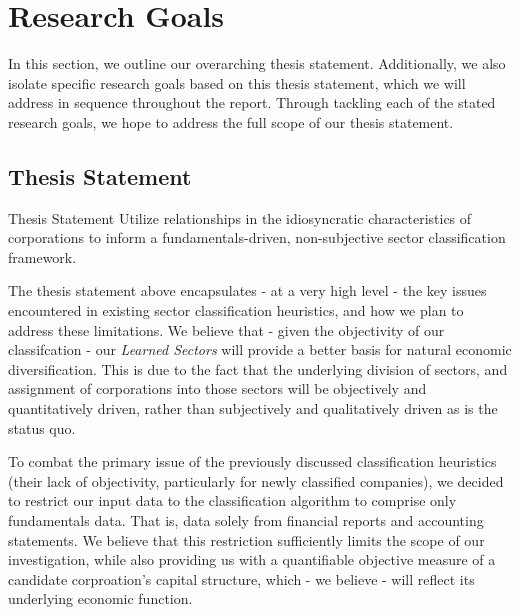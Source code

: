 \documentclass[../main.tex]{subfiles}
\begin{document}
    
\chapter{Research Goals} \label{research_goals}
    
In this section, we outline our overarching thesis statement. Additionally, we also isolate specific research goals based on this thesis statement, which we will address in sequence throughout the report. Through tackling each of the stated research goals, we hope to address the full scope of our thesis statement.

\section{Thesis Statement} \label{research_goals:thesis_statement}

\begin{center}
    \begin{minipage}{0.7\textwidth}
        \begin{bclogo}[couleur=blue!30, arrondi=0.1, logo=\bcloupe, ombre=false]{\;Thesis Statement}
            Utilize relationships in the idiosyncratic characteristics of corporations to inform a fundamentals-driven, non-subjective sector classification framework.
        \end{bclogo}
    \end{minipage}
\end{center}

\vspace{1em}

The thesis statement above encapsulates - at a very high level - the key issues encountered in existing sector classification heuristics, and how we plan to address these limitations. We believe that - given the objectivity of our classifcation - our \textit{Learned Sectors} will provide a better basis for natural economic diversification. This is due to the fact that the underlying division of sectors, and assignment of corporations into those sectors will be objectively and quantitatively driven, rather than subjectively and qualitatively driven as is the status quo.

To combat the primary issue of the previously discussed classification heuristics (their lack of objectivity, particularly for newly classified companies), we decided to restrict our input data to the classification algorithm to comprise only fundamentals data. That is, data solely from financial reports and accounting statements. We believe that this restriction sufficiently limits the scope of our investigation, while also providing us with a quantifiable objective measure of a candidate corproation's capital structure, which - we believe - will reflect its underlying economic function.
\end{document}

